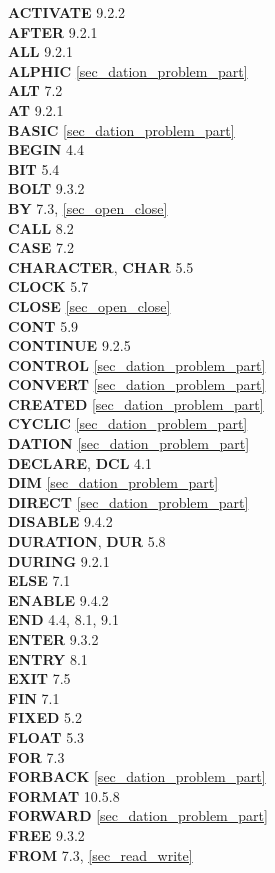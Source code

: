 {
{\bf ACTIVATE} 9.2.2\\
{\bf AFTER} 9.2.1\\
{\bf ALL} 9.2.1\\
{\bf ALPHIC} \ref{sec_dation_problem_part}\\
{\bf ALT} 7.2\\
{\bf AT} 9.2.1\\

{\bf BASIC} \ref{sec_dation_problem_part}\\
{\bf BEGIN} 4.4 \\
{\bf BIT} 5.4\\
{\bf BOLT} 9.3.2\\
{\bf BY} 7.3, \ref{sec_open_close}\\

{\bf CALL} 8.2\\
{\bf CASE} 7.2\\
{\bf CHARACTER}, {\bf CHAR} 5.5\\
{\bf CLOCK} 5.7\\
{\bf CLOSE} \ref{sec_open_close}\\
{\bf CONT} 5.9\\
{\bf CONTINUE} 9.2.5\\
{\bf CONTROL} \ref{sec_dation_problem_part}\\
{\bf CONVERT} \ref{sec_dation_problem_part}\\
{\bf CREATED} \ref{sec_dation_problem_part}\\
{\bf CYCLIC} \ref{sec_dation_problem_part}\\
 
{\bf DATION} \ref{sec_dation_problem_part}\\
{\bf DECLARE}, {\bf DCL} 4.1\\
{\bf DIM} \ref{sec_dation_problem_part}\\
{\bf DIRECT} \ref{sec_dation_problem_part}\\
{\bf DISABLE} 9.4.2\\
{\bf DURATION}, {\bf DUR} 5.8\\
{\bf DURING} 9.2.1\\

{\bf ELSE} 7.1\\
{\bf ENABLE} 9.4.2\\
{\bf END} 4.4, 8.1, 9.1\\
{\bf ENTER} 9.3.2\\
{\bf ENTRY} 8.1\\
{\bf EXIT} 7.5\\

{\bf FIN} 7.1\\
{\bf FIXED} 5.2\\
{\bf FLOAT} 5.3\\
{\bf FOR} 7.3\\
{\bf FORBACK} \ref{sec_dation_problem_part}\\
{\bf FORMAT} 10.5.8\\
{\bf FORWARD} \ref{sec_dation_problem_part}\\
{\bf FREE} 9.3.2\\
{\bf FROM} 7.3, \ref{sec_read_write}\\
 
}
